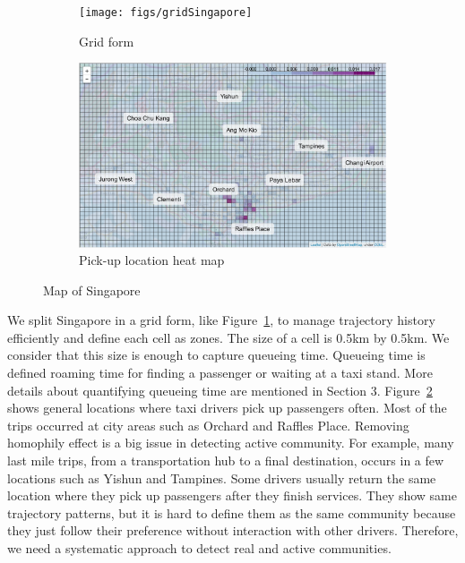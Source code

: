 \documentclass{article}
\begin{document}
\begin{figure} [h] 

\centering
\begin{subfigure}{\linewidth}
  \centering
  \texttt{[image: figs/gridSingapore]}
  \caption{Grid form}
  \label{fig:gridSingapore}
\end{subfigure}

\begin{subfigure}{\linewidth}
  \centering
  \includegraphics[width=0.95\linewidth]{figs/locationHeatMap}
  \caption{Pick-up location heat map}
  \label{fig:locationHeatMap}
\end{subfigure}

\caption{Map of Singapore}
\label{fig:mapSingapore}
\end{figure}


We split Singapore in a grid form, like Figure~\ref{fig:gridSingapore}, to manage trajectory history efficiently and define each cell as zones. The size of a cell is 0.5km by 0.5km. We consider that this size is enough to capture queueing time. Queueing time is defined roaming time for finding a passenger or waiting at a taxi stand. More details about quantifying queueing time are mentioned in Section 3. Figure~\ref{fig:locationHeatMap} shows general locations where taxi drivers pick up passengers often. Most of the trips occurred at city areas such as Orchard and Raffles Place. Removing homophily effect is a big issue in detecting active community. For example, many last mile trips, from a transportation hub to a final destination, occurs in a few locations such as Yishun and Tampines. Some drivers usually return the same location where they pick up passengers after they finish services. They show same trajectory patterns, but it is hard to define them as the same community because they just follow their preference without interaction with other drivers. Therefore, we need a systematic approach to detect real and active communities.
\end{document}
